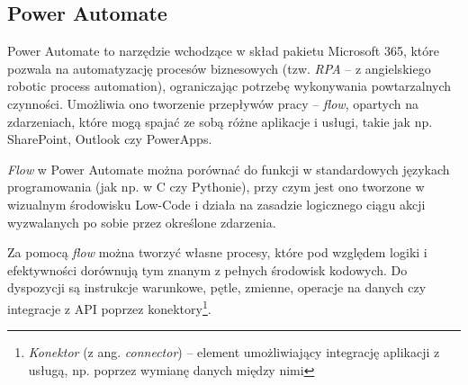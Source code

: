 \subsection{Power Automate}

Power Automate to narzędzie wchodzące w skład pakietu Microsoft 365, które pozwala na automatyzację procesów biznesowych (tzw. \textit{RPA} -- z angielskiego robotic process automation), ograniczając potrzebę wykonywania powtarzalnych czynności. Umożliwia ono tworzenie przepływów pracy -- \emph{flow}, opartych na zdarzeniach, które mogą spajać ze sobą różne aplikacje i usługi, takie jak np. SharePoint, Outlook czy PowerApps.

\emph{Flow} w Power Automate można porównać do funkcji w standardowych językach programowania (jak np. w C czy Pythonie), przy czym jest ono tworzone w wizualnym środowisku Low-Code i działa na zasadzie logicznego ciągu akcji wyzwalanych po sobie przez określone zdarzenia.

Za pomocą \emph{flow} można tworzyć własne procesy, które pod względem logiki i efektywności dorównują tym znanym z pełnych środowisk kodowych. Do dyspozycji są instrukcje warunkowe, pętle, zmienne, operacje na danych czy integracje z API poprzez konektory\footnote{\emph{Konektor} (z ang. \emph{connector}) -- element umożliwiający integrację aplikacji z usługą, np. poprzez wymianę danych między nimi}.
